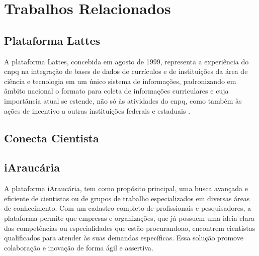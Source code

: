 \chapter{Trabalhos Relacionados}\label{cap:trabalhos:relacionados}

\section{Plataforma Lattes}\label{sec:lattes}

A plataforma Lattes, concebida em agosto de 1999, representa a experiência do \gls{cnpq} na integração de bases de dados de currículos e de instituições da área de ciência e tecnologia em um único sistema de informações, padronizando em âmbito nacional o formato para coleta de informações curriculares e cuja importância atual se estende, não só às atividades do \gls{cnpq}, como também às ações de incentivo a outras instituições federais e estaduais \cite{Lattes}.

\section{Conecta Cientista}\label{sec:conecta}


\section{iAraucária}\label{sec:iaraucaria}

A plataforma iAraucária, tem como propósito principal, uma busca avançada e eficiente de cientistas ou de grupos de trabalho especializados em diversas áreas de conhecimento. Com um cadastro completo de profissionais e pesquisadores, a plataforma permite que empresas e organizações, que já possuem uma ideia clara das competências ou especialidades que estão procurandoao, encontrem cientistas qualificados para atender às suas demandas específicas. Essa solução promove colaboração e inovação de forma ágil e assertiva.